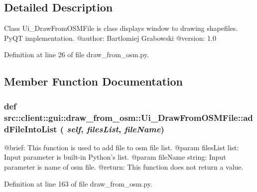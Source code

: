 \subsection{Detailed Description}
\begin{DoxyVerb}
Class Ui_DrawFromOSMFile is class displays window to drawing shapefiles. PyQT implementation.
@author: Bartlomiej Grabowski
@version: 1.0
\end{DoxyVerb}
 

Definition at line 26 of file draw\_\-from\_\-osm.py.



\subsection{Member Function Documentation}
\hypertarget{classsrc_1_1client_1_1gui_1_1draw__from__osm_1_1Ui__DrawFromOSMFile_a0434fc2055d2bec83acccb6ed890594e}{
\subsubsection[{addFileIntoList}]{\setlength{\rightskip}{0pt plus 5cm}def src::client::gui::draw\_\-from\_\-osm::Ui\_\-DrawFromOSMFile::addFileIntoList ( {\em self}, \/   {\em filesList}, \/   {\em fileName})}}
\label{classsrc_1_1client_1_1gui_1_1draw__from__osm_1_1Ui__DrawFromOSMFile_a0434fc2055d2bec83acccb6ed890594e}
\begin{DoxyVerb}
@brief: This function is used to add file to osm file list.
@param filesList list: Input parameter is built-in Python's list.
@param fileName string: Input parameter is name of osm file. 
@return: This function does not return a value.
\end{DoxyVerb}
 

Definition at line 163 of file draw\_\-from\_\-osm.py.

